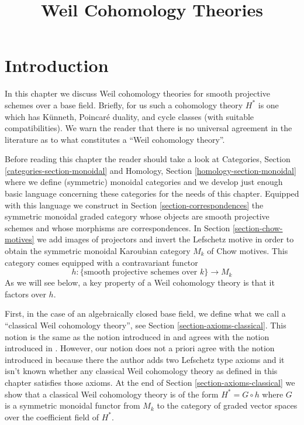 

%


\title{Weil Cohomology Theories}


\maketitle

\label{section-phantom}

\tableofcontents



\section{Introduction}
\label{section-introduction}

\noindent
In this chapter we discuss Weil cohomology theories for smooth
projective schemes over a base field. Briefly, for us such a cohomology
theory $H^*$ is one which has K\"unneth, Poincar\'e duality,
and cycle classes (with suitable compatibilities). We warn the reader that
there is no universal agreement in the literature as to what
constitutes a ``Weil cohomology theory''.

\medskip\noindent
Before reading this chapter the reader should take a look at
Categories, Section \ref{categories-section-monoidal} and
Homology, Section \ref{homology-section-monoidal} where
we define (symmetric) monoidal categories and we develop just enough
basic language concerning these categories for the needs of this chapter.
Equipped with this language we construct in
Section \ref{section-correspondences} the symmetric monoidal
graded category whose objects are smooth projective schemes and
whose morphisms are correspondences. In Section \ref{section-chow-motives}
we add images of projectors and invert the Lefschetz motive in
order to obtain the symmetric monoidal Karoubian category $M_k$
of Chow motives. This category comes equipped with a contravariant functor
$$
h : \{\text{smooth projective schemes over }k\} \longrightarrow M_k
$$
As we will see below, a key property of a Weil cohomology theory is
that it factors over $h$.

\medskip\noindent
First, in the case of an algebraically closed base field, we define
what we call a ``classical Weil cohomology theory'',
see Section \ref{section-axioms-classical}. This notion is the
same as the notion introduced in \cite[Section 1.2]{Kleiman-cycles} and
agrees with the notion introduced in \cite[page 65]{Kleiman-motives}.
However, our notion does not a priori agree with the notion introduced in
\cite[page 10]{Kleiman-standard} because there the author adds two Lefschetz
type axioms and it isn't known whether any classical Weil cohomology
theory as defined in this chapter satisfies those axioms.
At the end of Section \ref{section-axioms-classical} we show that
a classical Weil cohomology theory is of the form $H^* = G \circ h$
where $G$ is a symmetric monoidal functor from $M_k$ to the category
of graded vector spaces over the coefficient field of $H^*$.

